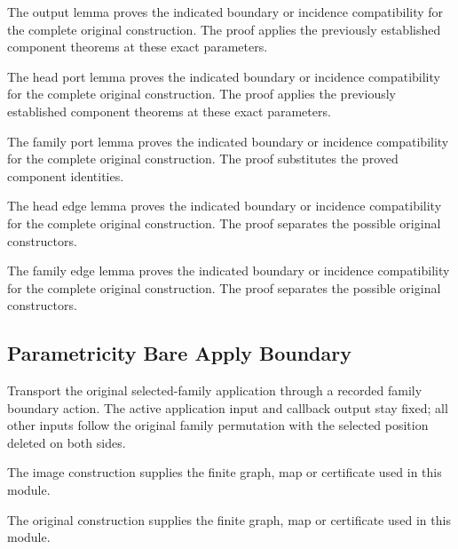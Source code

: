 The output lemma proves the indicated boundary or incidence compatibility for the complete original construction.
The proof applies the previously established component theorems at these exact parameters.
\par{}

The head port lemma proves the indicated boundary or incidence compatibility for the complete original construction.
The proof applies the previously established component theorems at these exact parameters.
\par{}

The family port lemma proves the indicated boundary or incidence compatibility for the complete original construction.
The proof substitutes the proved component identities.
\par{}

The head edge lemma proves the indicated boundary or incidence compatibility for the complete original construction.
The proof separates the possible original constructors.
\par{}

The family edge lemma proves the indicated boundary or incidence compatibility for the complete original construction.
The proof separates the possible original constructors.
\par{}

\subsection{Parametricity Bare Apply Boundary}
Transport the original selected-family application through a recorded
family boundary action. The active application input and callback output stay
fixed; all other inputs follow the original family permutation with the
selected position deleted on both sides.

The image construction supplies the finite graph, map or certificate used in this module.
\par{}

The original construction supplies the finite graph, map or certificate used in this module.
\par{}

